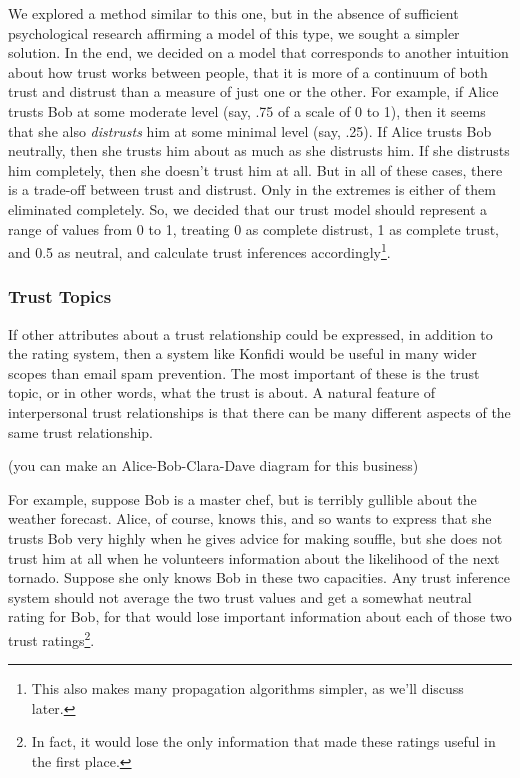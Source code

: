 \documentclass{acm_proc_article-sp}
\begin{document}
We explored a method similar to this one, but in the absence of sufficient psychological research affirming a model of this type, we sought a simpler solution.  In the end, we decided on a model that corresponds to another intuition about how trust works between people, that it is more of a continuum of both trust and distrust than a measure of just one or the other.  For example, if Alice trusts Bob at some moderate level (say, .75 of a scale of 0 to 1), then it seems that she also \textit{distrusts} him at some minimal level (say, .25).  If Alice trusts Bob neutrally, then she trusts him about as much as she distrusts him.  If she distrusts him completely, then she doesn't trust him at all.  But in all of these cases, there is a trade-off between trust and distrust.  Only in the extremes is either of them eliminated completely.  So, we decided that our trust model should represent a range of values from 0 to 1, treating 0 as complete distrust, 1 as complete trust, and 0.5 as neutral, and calculate trust inferences accordingly\footnote{This also makes many propagation algorithms simpler, as we'll discuss later.}.

\subsubsection{Trust Topics}
If other attributes about a trust relationship could be expressed, in addition to the rating system, then a system like Konfidi would be useful in many wider scopes than email spam prevention.  The most important of these is the trust topic, or in other words, what the trust is about.  A natural feature of interpersonal trust relationships is that there can be many different aspects of the same trust relationship.  

(you can make an Alice-Bob-Clara-Dave diagram for this business)

For example, suppose Bob is a master chef, but is terribly gullible about the weather forecast.  Alice, of course, knows this, and so wants to express that she trusts Bob very highly when he gives advice for making souffle, but she does not trust him at all when he volunteers information about the likelihood of the next tornado.  Suppose she only knows Bob in these two capacities.  Any trust inference system should not average the two trust values and get a somewhat neutral rating for Bob, for that would lose important information about each of those two trust ratings\footnote{In fact, it would lose the only information that made these ratings useful in the first place.}.
\end{document}
